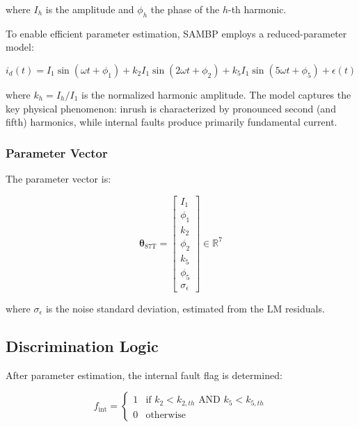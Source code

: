 \documentclass[12pt,a4paper]{article}
\newcommand{\thetaT}{\boldsymbol{\theta}_{\text{87T}}}
\begin{document}
where $I_h$ is the amplitude and $\phi_h$ the phase of the $h$-th harmonic.

To enable efficient parameter estimation, SAMBP employs a reduced-parameter model:

\begin{equation}
i_d(t) = I_1 \sin(\omega t + \phi_1) + k_2 I_1 \sin(2\omega t + \phi_2) + k_5 I_1 \sin(5\omega t + \phi_5) + \epsilon(t)
\label{eq:87t_reduced}
\end{equation}

where $k_h = I_h / I_1$ is the normalized harmonic amplitude. The model captures the 
key physical phenomenon: inrush is characterized by pronounced second (and fifth) harmonics, 
while internal faults produce primarily fundamental current.

\subsubsection{Parameter Vector}

The parameter vector is:

\begin{equation}
\thetaT = \begin{bmatrix} I_1 \\ \phi_1 \\ k_2 \\ \phi_2 \\ k_5 \\ \phi_5 \\ \sigma_{\epsilon} \end{bmatrix} \in \mathbb{R}^{7}
\label{eq:87t_theta}
\end{equation}

where $\sigma_{\epsilon}$ is the noise standard deviation, estimated from the LM residuals.

\subsection{Discrimination Logic}
\label{subsec:87t_logic}

After parameter estimation, the internal fault flag is determined:

\begin{equation}
f_{\text{int}} = \begin{cases}
1 & \text{if } k_2 < k_{2,th} \text{ AND } k_5 < k_{5,th} \\
0 & \text{otherwise}
\end{cases}
\label{eq:87t_fint}
\end{equation}
\end{document}
